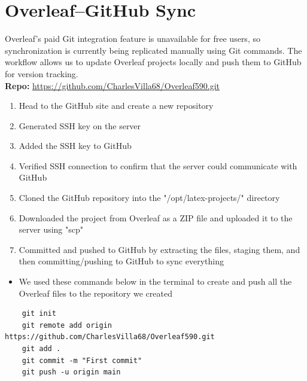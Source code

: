 
\section{Overleaf–GitHub Sync}
Overleaf’s paid Git integration feature is unavailable for free users, so synchronization is currently being replicated manually using Git commands.  
The workflow allows us to update Overleaf projects locally and push them to GitHub for version tracking. \\

\textbf{Repo: }\url{https://github.com/CharlesVilla68/Overleaf590.git}

\begin{enumerate}
    \item Head to the GitHub site and create a new repository
    \item Generated SSH key on the server
    \item Added the SSH key to GitHub
    \item Verified SSH connection to confirm that the server could communicate with GitHub
    \item Cloned the GitHub repository into the "/opt/latex-projects/" directory
    \item Downloaded the project from Overleaf as a ZIP file and uploaded it to the server using "scp"
    \item Committed and pushed to GitHub by extracting the files, staging them, and then committing/pushing to GitHub to sync everything
\end{enumerate}

\begin{itemize}
    \item We used these commands below in the terminal to create and push all the Overleaf files to the repository we created
\end{itemize}

\begin{verbatim}
    git init 
    git remote add origin https://github.com/CharlesVilla68/Overleaf590.git
    git add . 
    git commit -m "First commit"
    git push -u origin main
\end{verbatim}

